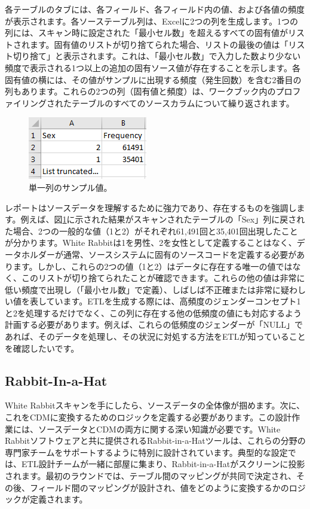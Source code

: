 \documentclass[
  11pt]{book}
\theoremstyle{definition}
\theoremstyle{definition}
\theoremstyle{definition}
\theoremstyle{definition}
\theoremstyle{remark}
\begin{document}
各テーブルのタブには、各フィールド、各フィールド内の値、および各値の頻度が表示されます。各ソーステーブル列は、Excelに2つの列を生成します。1つの列には、スキャン時に設定された「最小セル数」を超えるすべての固有値がリストされます。固有値のリストが切り捨てられた場合、リストの最後の値は「リスト切り捨て」と表示されます。これは、「最小セル数」で入力した数より少ない頻度で表示される1つ以上の追加の固有ソース値が存在することを示します。各固有値の横には、その値がサンプルに出現する頻度（発生回数）を含む2番目の列もあります。これらの2つの列（固有値と頻度）は、ワークブック内のプロファイリングされたテーブルのすべてのソースカラムについて繰り返されます。

\begin{figure}

{\centering \includegraphics[width=0.3\linewidth]{images/ExtractTransformLoad/ScanSex} 

}

\caption{単一列のサンプル値。}\label{fig:scanSex}
\end{figure}

レポートはソースデータを理解するために強力であり、存在するものを強調します。例えば、図\ref{fig:scanSex}に示された結果がスキャンされたテーブルの「Sex」列に戻された場合、2つの一般的な値（1と2）がそれぞれ61,491回と35,401回出現したことが分かります。White Rabbitは1を男性、2を女性として定義することはなく、データホルダーが通常、ソースシステムに固有のソースコードを定義する必要があります。しかし、これらの2つの値（1と2）はデータに存在する唯一の値ではなく、このリストが切り捨てられたことが確認できます。これらの他の値は非常に低い頻度で出現し（「最小セル数」で定義）、しばしば不正確または非常に疑わしい値を表しています。ETLを生成する際には、高頻度のジェンダーコンセプト1と2を処理するだけでなく、この列に存在する他の低頻度の値にも対応するよう計画する必要があります。例えば、これらの低頻度のジェンダーが「NULL」であれば、そのデータを処理し、その状況に対処する方法をETLが知っていることを確認したいです。

\subsection{Rabbit-In-a-Hat}\label{rabbit-in-a-hat}

White Rabbitスキャンを手にしたら、ソースデータの全体像が掴めます。次に、これをCDMに変換するためのロジックを定義する必要があります。この設計作業には、ソースデータとCDMの両方に関する深い知識が必要です。White Rabbitソフトウェアと共に提供されるRabbit-in-a-Hatツールは、これらの分野の専門家チームをサポートするように特別に設計されています。典型的な設定では、ETL設計チームが一緒に部屋に集まり、Rabbit-in-a-Hatがスクリーンに投影されます。最初のラウンドでは、テーブル間のマッピングが共同で決定され、その後、フィールド間のマッピングが設計され、値をどのように変換するかのロジックが定義されます。 
\end{document}
